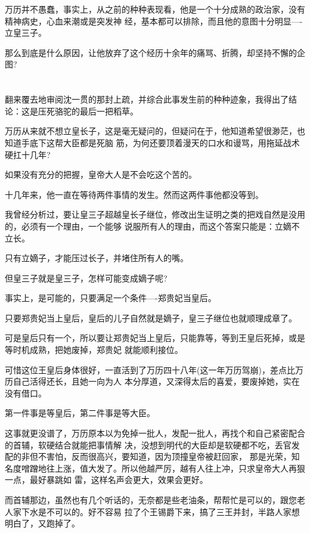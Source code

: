 \documentclass[11pt,a4paper,onecolumn]{article}
\begin{document}
万历并不愚蠢，事实上，从之前的种种表现看，他是一个十分成熟的政治家，没有精神病史，心血来潮或是突发神
经，基本都可以排除，而且他的意图十分明显----立皇三子。

那么到底是什么原因，让他放弃了这个经历十余年的痛骂、折腾，却坚持不懈的企图?

\section[\thesection]{}

翻来覆去地审阅沈一贯的那封上疏，并综合此事发生前的种种迹象，我得出了结论：这是压死骆驼的最后一把稻草。

万历从来就不想立皇长子，这是毫无疑问的，但疑问在于，他知道希望很渺茫，也知道手底下这帮大臣都是死脑
筋，为何还要顶着漫天的口水和谩骂，用拖延战术硬扛十几年?

如果没有充分的把握，皇帝大人是不会吃这个苦的。

十几年来，他一直在等待两件事情的发生。然而这两件事他都没等到。

我曾经分析过，要让皇三子超越皇长子继位，修改出生证明之类的把戏自然是没用的，必须有一个理由，一个能够
说服所有人的理由，而这个答案只能是：立嫡不立长。

只有立嫡子，才能压过长子，并堵住所有人的嘴。

但皇三子就是皇三子，怎样可能变成嫡子呢?

事实上，是可能的，只要满足一个条件----郑贵妃当皇后。

只要郑贵妃当上皇后，皇后的儿子自然就是嫡子，皇三子继位也就顺理成章了。

可是皇后只有一个，所以要让郑贵妃当上皇后，只能靠等，等到王皇后死掉，或是等时机成熟，把她废掉，郑贵妃
就能顺利接位。

可惜这位王皇后身体很好，一直活到了万历四十八年(这一年万历驾崩)，差点比万历自己活得还长，且她一向为人
本分厚道，又深得太后的喜爱，要废掉她，实在没有借口。

第一件事是等皇后，第二件事是等大臣。

这事就更没谱了，万历原本以为免掉一批人，发配一批人，再找个和自己紧密配合的首辅，软硬结合就能把事情解
决，没想到明代的大臣却是软硬都不吃，丢官发配的非但不害怕，反而很高兴，要知道，因为顶撞皇帝被赶回家，
那是光荣，知名度噌蹭地往上涨，值大发了。所以他越严厉，越有人往上冲，只求皇帝大人再狠一点，最好暴跳如
雷，这样名声会更大，效果会更好。

而首辅那边，虽然也有几个听话的，无奈都是些老油条，帮帮忙是可以的，跟您老人家下水是不可以的。好不容易
拉了个王锡爵下来，搞了三王并封，半路人家想明白了，又跑掉了。
\end{document}
